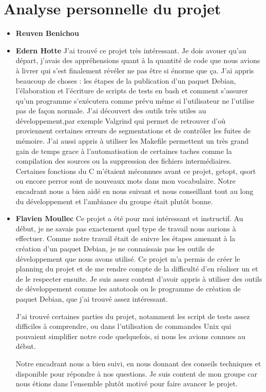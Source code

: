 \chapter{Analyse personnelle du projet}

\begin{itemize}
\item [\textbullet] \Large \textbf{Reuven Benichou}
\newline
\normalsize
\item [\textbullet] \Large \textbf{Edern Hotte}
\newline
\normalsize
J'ai trouv\'e ce projet tr\`es int\'eressant. Je dois avouer qu'au d\'epart, j'avais des appr\'ehensions quant \`a la quantit\'e de code que nous avions \`a livrer qui s'est finalement 
r\'ev\'eler ne pas \^etre si \'enorme que \c ca. J'ai appris beaucoup de choses : les \'etapes de la publication d'un paquet Debian, l'\'elaboration et l'\'ecriture de scripts de tests 
en bash et comment s'assurer qu'un programme s'ex\'ecutera comme pr\'evu m\^eme si l'utilisateur ne l'utilise pas de fa\c con normale. J'ai d\'ecouvert des outils tr\`es utiles au d\'eveloppement,par exemple Valgrind qui permet de retrouver
d'o\`u proviennent certaines erreurs de segmentations et de contr\^oler les fuites de m\'emoire. J'ai aussi appris \`a utiliser les Makefile permettent un tr\`es grand gain
de temps grace \`a l'automatisation de certaines taches comme la compilation des sources ou la suppression des fichiers interm\'ediaires. Certaines fonctions du C m'\'etaient m\'econnues avant ce projet,
getopt, qsort ou encore perror sont de nouveaux mots dans mon vocabulaire. Notre encadrant nous a bien aid\'e en nous suivant et nous conseillant tout au long du d\'eveloppement et l'ambiance du groupe \'etait plut\^ot bonne.\newline
\item [\textbullet] \Large \textbf{Flavien Moullec}
\newline
\normalsize
Ce projet a \'et\'e pour moi int\'eressant et instructif. Au d\'ebut, je ne savais pas exactement quel type de travail nous aurions \`a effectuer.
Comme notre travail \'etait de suivre les \'etapes amenant \`a la cr\'eation d'un paquet Debian, je ne connaissais pas les outils de
d\'eveloppement que nous avons utilis\'e. Ce projet m'a permis de cr\'eer le planning du projet et de me rendre compte de la difficult\'e d'en r\'ealiser un
et de le respecter ensuite. Je suis assez content d'avoir appris \`a utiliser des outils de d\'eveloppement comme les autotools ou le programme de cr\'eation de 
paquet Debian, que j'ai trouv\'e assez int\'eressant.

J'ai trouv\'e certaines parties du projet, notamment les script de tests assez difficiles \`a comprendre, ou dans l'utilisation de commandes Unix qui pouvaient
simplifier notre code quelquefois, si nous les avions connues au d\'ebut.

Notre encadrant nous a bien suivi, en nous donnant des conseils techniques et disponible pour r\'epondre \`a nos questions.
Je suis content de mon groupe car nous \'etions dans l'ensemble plut\^ot motiv\'e pour faire avancer le projet.


\end{itemize}
